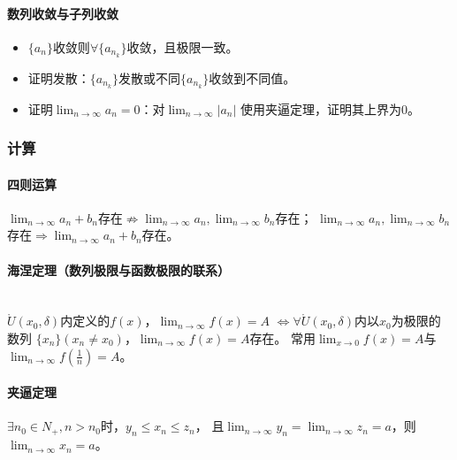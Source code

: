 \documentclass[
12pt, %
a4paper, 
oneside, %
headinclude,footinclude, %
]{scrartcl}
\begin{document}
\paragraph{数列收敛与子列收敛}
\begin{itemize}
\item $ \{a_n\} $收敛则$ \forall \{a_{n_k}\} $收敛，且极限一致。
\item 证明发散：$ \{a_{n_k}\} $发散或不同$ \{a_{n_k}\} $收敛到不同值。
\item 证明$ \lim_{n \to \infty} a_n = 0 $：对$ \lim_{n \to \infty} |a_n| $
使用夹逼定理，证明其上界为$ 0 $。
\end{itemize}
\subsubsection[计算]{计算}
\paragraph{四则运算}
$ \lim_{n \to \infty} a_n + b_n $存在$ \nRightarrow $$ \lim_{n \to \infty} a_n, \lim_{n \to \infty} b_n $存在；
$ \lim_{n \to \infty} a_n, \lim_{n \to \infty} b_n $存在$ \Rightarrow $$ \lim_{n \to \infty} a_n + b_n $存在。
\paragraph{海涅定理（数列极限与函数极限的联系）}~\\

$ \mathring{U}(x_0, \delta) $内定义的$ f(x) $，$ \lim_{n \to \infty} f(x) = A $
$ \Leftrightarrow $$ \forall \mathring{U}(x_0, \delta) $内以$ x_0 $为极限的数列
$ \{x_n\}(x_n \neq x_0) $，$ \lim_{n \to \infty} f(x) = A $存在。
常用$ \lim_{x \to 0} f(x) = A $与$ \lim_{n \to \infty} f(\frac{1}{n}) = A $。
\paragraph{夹逼定理}
$ \exists n_0 \in N_+, n > n_0 $时，$ y_n \leq x_n \leq z_n $，
且$ \lim_{n \to \infty} y_n = \lim_{n \to \infty} z_n = a $，则$ \lim_{n \to \infty} x_n = a $。
\end{document}

